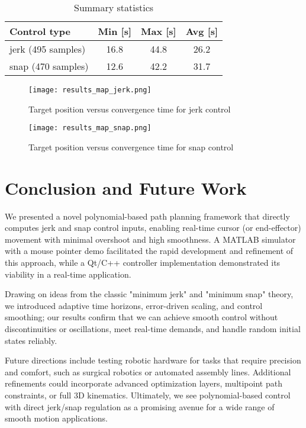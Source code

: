 \documentclass[12pt]{article}
\begin{document}
\begin{table}[h]
    \centering
    \begin{tabular}{lccc}
        \hline
        Control type & Min [s]& Max [s]& Avg [s]\\
        \hline
        jerk (495 samples) & 16.8 & 44.8 & 26.2 \\
        snap (470 samples) & 12.6 & 42.2 & 31.7 \\
        \hline
    \end{tabular}
    \caption{Summary statistics}
    \label{tab:control_type_statistics}
\end{table}
\begin{figure}
    \centering
    \texttt{[image: results\_map\_jerk.png]}
    \caption{Target position versus convergence time for jerk control}
    \label{fig:enter-label}
\end{figure}
\begin{figure}
    \centering
    \texttt{[image: results\_map\_snap.png]}
    \caption{Target position versus convergence time for snap control}
    \label{fig:enter-label}
\end{figure}

\section{Conclusion and Future Work}
\label{sec:conclusions}
We presented a novel polynomial-based path planning framework that directly computes jerk and snap control inputs, enabling real-time cursor (or end-effector) movement with minimal overshoot and high smoothness. A MATLAB simulator with a mouse pointer demo facilitated the rapid development and refinement of this approach, while a Qt/C++ controller implementation demonstrated its viability in a real-time application. 

Drawing on ideas from the classic "minimum jerk" and "minimum snap" theory, we introduced adaptive time horizons, error-driven scaling, and control smoothing; our results confirm that we can achieve smooth control without discontinuities or oscillations, meet real-time demands, and handle random initial states reliably.

Future directions include testing robotic hardware for tasks that require precision and comfort, such as surgical robotics or automated assembly lines. Additional refinements could incorporate advanced optimization layers, multipoint path constraints, or full 3D kinematics. Ultimately, we see polynomial-based control with direct jerk/snap regulation as a promising avenue for a wide range of smooth motion applications.
\end{document}
